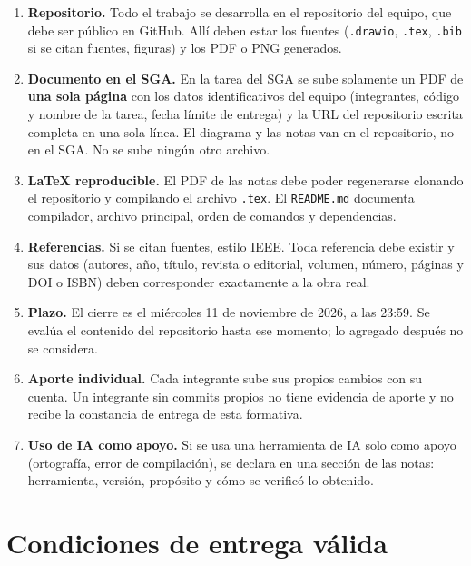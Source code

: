 \documentclass[11pt]{article}
\newcommand{\seccion}[1]{\section{\textcolor{utegreendk}{#1}}}
\begin{document}
\begin{enumerate}[leftmargin=20pt,itemsep=3pt]
	\item \textbf{Repositorio.} Todo el trabajo se desarrolla en el repositorio del equipo, que debe ser público en GitHub. Allí deben estar los fuentes (\texttt{.drawio}, \texttt{.tex}, \texttt{.bib} si se citan fuentes, figuras) y los PDF o PNG generados.
	\item \textbf{Documento en el SGA.} En la tarea del SGA se sube solamente un PDF de \textbf{una sola página} con los datos identificativos del equipo (integrantes, código y nombre de la tarea, fecha límite de entrega) y la URL del repositorio escrita completa en una sola línea. El diagrama y las notas van en el repositorio, no en el SGA. No se sube ningún otro archivo.
	\item \textbf{\LaTeX{} reproducible.} El PDF de las notas debe poder regenerarse clonando el repositorio y compilando el archivo \texttt{.tex}. El \texttt{README.md} documenta compilador, archivo principal, orden de comandos y dependencias.
	\item \textbf{Referencias.} Si se citan fuentes, estilo IEEE. Toda referencia debe existir y sus datos (autores, año, título, revista o editorial, volumen, número, páginas y DOI o ISBN) deben corresponder exactamente a la obra real.
	\item \textbf{Plazo.} El cierre es el miércoles 11 de noviembre de 2026, a las 23:59. Se evalúa el contenido del repositorio hasta ese momento; lo agregado después no se considera.
	\item \textbf{Aporte individual.} Cada integrante sube sus propios cambios con su cuenta. Un integrante sin commits propios no tiene evidencia de aporte y no recibe la constancia de entrega de esta formativa.
	\item \textbf{Uso de IA como apoyo.} Si se usa una herramienta de IA solo como apoyo (ortografía, error de compilación), se declara en una sección de las notas: herramienta, versión, propósito y cómo se verificó lo obtenido.
\end{enumerate}

\seccion{Condiciones de entrega válida}
\end{document}
